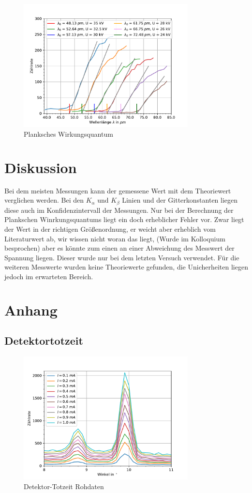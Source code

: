 \documentclass[11pt, a4paper]{article}
\begin{document}
    \begin{figure}
        \centering
        \includegraphics[width=0.8\textwidth]{Plank.pdf}
        \caption{Planksches Wirkungsquantum}
        \label{fig:plank}
    \end{figure}

    \section{Diskussion}

    Bei dem meisten Messungen kann der gemessene Wert mit dem Theoriewert verglichen werden. Bei den $K_{\alpha}$ und $K_{\beta}$ Linien und der Gitterkonstanten liegen diese auch im Konfidenzintervall der Messungen. Nur bei der Berechnung der Plankschen Winrkungsquantums liegt ein doch erheblicher Fehler vor.  Zwar liegt der Wert in der richtigen Größenordnung, er weicht aber erheblich vom Literaturwert ab, wir wissen nicht woran das liegt, (Wurde im Kolloquium besprochen)  aber es könnte zum einen an einer Abweichung des Messwert der Spannung liegen. Dieser wurde nur bei dem letzten Versuch verwendet. Für die weiteren Messwerte wurden keine Theoriewerte gefunden, die Unicherheiten liegen jedoch im erwarteten Bereich.

    \section{Anhang}

    \subsection{Detektortotzeit}

    \begin{figure}
        \centering
        \includegraphics[width=0.8\textwidth]{DetektortotzeitRoh.pdf}
        \caption{Detektor-Totzeit Rohdaten}
        \label{fig:totzeitroh}
    \end{figure}


    
    
\end{document}
